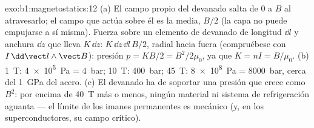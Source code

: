 \begin{solution}{exo:b1:magnetostatics:12}
(a) El campo propio del devanado salta de $0$ a $B$ al atravesarlo; el
campo que actúa sobre él es la media, $B/2$ (la capa no puede empujarse a
sí misma). Fuerza sobre un elemento de devanado de longitud $\dd l$ y anchura $\dd z$
que lleva $K\,\dd z$: $K\,\dd z\,\dd l\,B/2$, radial hacia fuera (compruébese con $I\,\dd\vect l
\wedge\vect B$): presión $p = KB/2 = B^2/2\mu_0$, ya que $K = nI = B/\mu_0$.
(b) \qty{1}{T}: \qty{4e5}{Pa} = \qty{4}{bar}; \qty{10}{T}: \qty{400}{bar}; \qty{45}{T}:
\qty{8e8}{Pa} = \qty{8000}{bar}, cerca del \qty{1}{GPa} del acero. (c) El
devanado ha de soportar una presión que crece como $B^2$: por encima de \qty{40}{T}
más o menos, ningún material ni sistema de refrigeración aguanta --- el límite de
los imanes permanentes es mecánico (y, en los superconductores, su campo crítico).
\end{solution}

